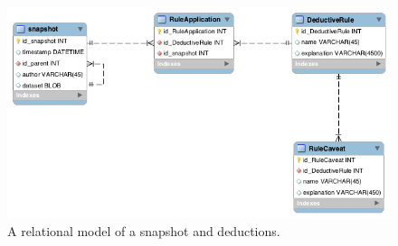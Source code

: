 \begin{figure}[h]
  \includegraphics[scale=0.5]{figures/deduction_model}
  \caption{A relational model of a snapshot and deductions.}
  \label{deduction_model}
\end{figure}

